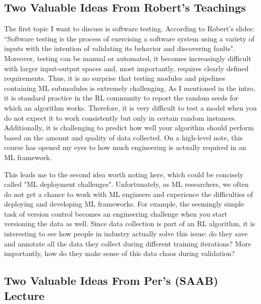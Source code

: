 \documentclass[11pt]{article}
\begin{document}
\subsection*{Two Valuable Ideas From Robert's Teachings}
The first topic I want to discuss is software testing. According to Robert's slides: “Software testing is the process of exercising a software system using a variety of inputs with the intention of validating its behavior and discovering faults". Moreover, testing can be manual or automated, it becomes increasingly difficult with larger input-output spaces and, most importantly, requires clearly defined requirements. Thus, it is no surprise that testing modules and pipelines containing ML submodules is extremely challenging. As I mentioned in the intro, it is standard practice in the RL community to report the random seeds for which an algorithm works. Therefore, it is very difficult to test a model when you do not expect it to work consistently but only in certain random instances. Additionally, it is challenging to predict how well your algorithm should perform based on the amount and quality of data collected. On a high-level note, this course has opened my eyes to how much engineering is actually required in an ML framework.     

This leads me to the second idea worth noting here, which could be concisely called "ML deployment challenges". Unfortunately, as ML researchers, we often do not get a chance to work with ML engineers and experience the difficulties of deploying and developing ML frameworks. For example, the seemingly simple task of version control becomes an engineering challenge when you start versioning the data as well. Since data collection is part of an RL algorithm, it is interesting to see how people in industry actually solve this issue: do they save and annotate all the data they collect during different training iterations? More importantly, how do they make sense of this data chaos during validation?    




\subsection*{Two Valuable Ideas From Per's (SAAB) Lecture}
\end{document}
